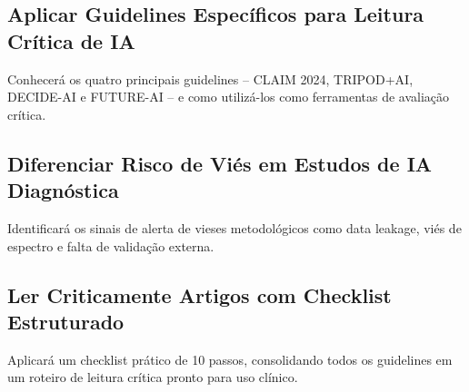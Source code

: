 \subsection{Aplicar Guidelines Específicos para Leitura Crítica de IA}
Conhecerá os quatro principais guidelines -- CLAIM 2024, TRIPOD+AI, DECIDE-AI e FUTURE-AI -- e como utilizá-los como ferramentas de avaliação crítica.

\subsection{Diferenciar Risco de Viés em Estudos de IA Diagnóstica}
Identificará os sinais de alerta de vieses metodológicos como data leakage, viés de espectro e falta de validação externa.

\subsection{Ler Criticamente Artigos com Checklist Estruturado}
Aplicará um checklist prático de 10 passos, consolidando todos os guidelines em um roteiro de leitura crítica pronto para uso clínico.


